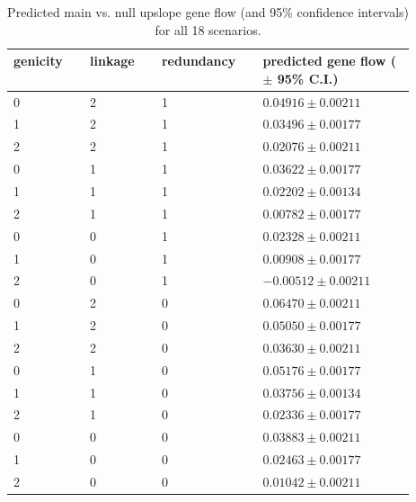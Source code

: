 \documentclass[9pt,twoside,lineno]{pnas-new}
\begin{document}
\begin{table}\centering
\caption{\label{tab:tab_s1}Predicted main vs. null upslope gene flow (and 95\% confidence intervals) for all 18 scenarios.}
\begin{tabular}{|b{0.1\linewidth}|b{0.1\linewidth}|b{0.1\linewidth}|b{0.22\linewidth}|}
\hline
\textbf{genicity} & \textbf{linkage} & \textbf{redundancy} & \textbf{predicted gene flow ($\pm$ 95\% C.I.)} \\
\hline
0 & 2 & 1 & $0.04916 \pm 0.00211$ \\
1 & 2 & 1 & $0.03496 \pm 0.00177$ \\
2 & 2 & 1 & $0.02076 \pm 0.00211$ \\
0 & 1 & 1 & $0.03622 \pm 0.00177$ \\
1 & 1 & 1 & $0.02202 \pm 0.00134$ \\
2 & 1 & 1 & $0.00782 \pm 0.00177$ \\
0 & 0 & 1 & $0.02328 \pm 0.00211$ \\
1 & 0 & 1 & $0.00908 \pm 0.00177$ \\
2 & 0 & 1 & $-0.00512 \pm 0.00211$ \\
0 & 2 & 0 & $0.06470 \pm 0.00211$ \\
1 & 2 & 0 & $0.05050 \pm 0.00177$ \\
2 & 2 & 0 & $0.03630 \pm 0.00211$ \\
0 & 1 & 0 & $0.05176 \pm 0.00177$ \\
1 & 1 & 0 & $0.03756 \pm 0.00134$ \\
2 & 1 & 0 & $0.02336 \pm 0.00177$ \\
0 & 0 & 0 & $0.03883 \pm 0.00211$ \\
1 & 0 & 0 & $0.02463 \pm 0.00177$ \\
2 & 0 & 0 & $0.01042 \pm 0.00211$ \\
\hline
\end{tabular}
\medskip
\end{table}



\FloatBarrier
\end{document}
